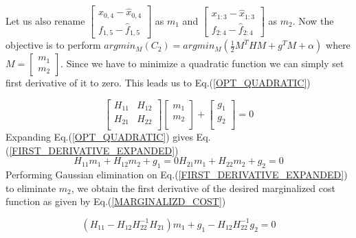 Let us also rename $\begin{bmatrix} x_{0, 4} - \hat x_{0, 4} \\ f_{1, 5} - \hat f_{1, 5} \end{bmatrix}$ as $m_1$ and $\begin{bmatrix} x_{1:3} - \hat x_{1:3} \\ f_{2:4} - \hat f_{2:4} \end{bmatrix}$ as $m_2$. Now the objective is to perform $argmin_M(C_2) = argmin_M(\frac{1}{2}M^THM + g^TM + \alpha)$ where $M = \begin{bmatrix} m_1 \\ m_2 \end{bmatrix}$. Since we have to minimize a quadratic function we can simply set first derivative of it to zero. This leads us to Eq.(\ref{OPT_QUADRATIC})

\begin{equation}
	\begin{bmatrix} 
				H_{11} & H_{12} \\
				H_{21} & H_{22} \\
	\end{bmatrix}
	\begin{bmatrix} 
				m_{1} \\
				m_{2} \\
	\end{bmatrix} + 
	\begin{bmatrix} 
				g_{1} \\
				g_{2} \\
	\end{bmatrix} = 0
	\label{OPT_QUADRATIC}
\end{equation}
Expanding Eq.(\ref{OPT_QUADRATIC}) gives Eq.(\ref{FIRST_DERIVATIVE_EXPANDED})
\begin{subequations}
	\begin{equation}
		H_{11}m_1 + H_{12}m_2 + g_1 = 0
	\end{equation}
	\begin{equation}
		H_{21}m_1 + H_{22}m_2 + g_2 = 0
	\end{equation}
\label{FIRST_DERIVATIVE_EXPANDED}
\end{subequations}
Performing Gaussian elimination on Eq.(\ref{FIRST_DERIVATIVE_EXPANDED}) to eliminate $m_2$, we obtain the first derivative of the desired marginalized cost function as given by Eq.(\ref{MARGINALIZD_COST})

\begin{equation}
	\left(H_{11} - H_{12}H_{22}^{-1}H_{21}\right)m_1 + g_1 - H_{12}H_{22}^{-1}g_2 = 0
\label{MARGINALIZD_COST}
\end{equation}

